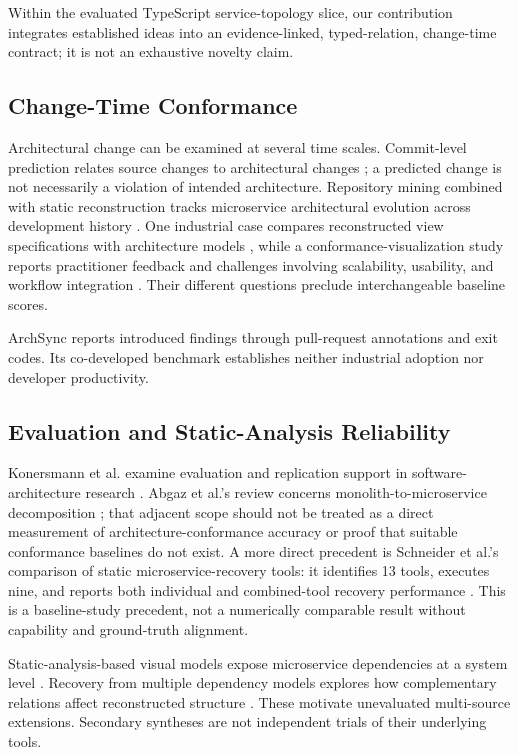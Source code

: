 \documentclass[conference]{IEEEtran}
\begin{document}
Within the evaluated TypeScript service-topology slice, our contribution integrates established ideas into an evidence-linked, typed-relation, change-time contract; it is not an exhaustive novelty claim.

\subsection{Change-Time Conformance}

Architectural change can be examined at several time scales. Commit-level prediction relates source changes to architectural changes \cite{commits2025}; a predicted change is not necessarily a violation of intended architecture. Repository mining combined with static reconstruction tracks microservice architectural evolution across development history \cite{evolution2024}. One industrial case compares reconstructed view specifications with architecture models \cite{uzun2024drift}, while a conformance-visualization study reports practitioner feedback and challenges involving scalability, usability, and workflow integration \cite{thermofisher2025}. Their different questions preclude interchangeable baseline scores.

ArchSync reports introduced findings through pull-request annotations and exit codes. Its co-developed benchmark establishes neither industrial adoption nor developer productivity.

\subsection{Evaluation and Static-Analysis Reliability}

Konersmann et al. examine evaluation and replication support in software-architecture research \cite{konersmann2022replicability}. Abgaz et al.'s review concerns monolith-to-microservice decomposition \cite{abgaz2023decomposition}; that adjacent scope should not be treated as a direct measurement of architecture-conformance accuracy or proof that suitable conformance baselines do not exist. A more direct precedent is Schneider et al.'s comparison of static microservice-recovery tools: it identifies 13 tools, executes nine, and reports both individual and combined-tool recovery performance \cite{schneider2025comparison}. This is a baseline-study precedent, not a numerically comparable result without capability and ground-truth alignment.

Static-analysis-based visual models expose microservice dependencies at a system level \cite{staticmodels2024}. Recovery from multiple dependency models explores how complementary relations affect reconstructed structure \cite{dependencies2024}. These motivate unevaluated multi-source extensions. Secondary syntheses are not independent trials of their underlying tools.
\end{document}
